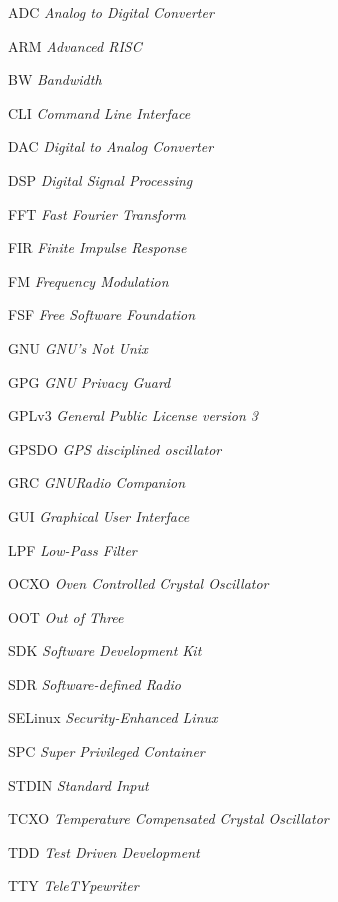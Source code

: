 \documentclass[
  12pt,				%
  openright,			%
  twoside,			%
  a4paper,			%
  english,			%
  french,				%
  spanish,			%
  brazil,				%
  ]{abntex2}
\begin{document}
\begin{siglas}

  \item[ADC]         \textit{Analog to Digital Converter}
  \item[ARM]        \textit{Advanced RISC}
  \item[BW]         \textit{Bandwidth}
  \item[CLI]        \textit{Command Line Interface}
  \item[DAC]        \textit{Digital to Analog Converter}
  \item[DSP]        \textit{Digital Signal Processing}
  \item[FFT]        \textit{Fast Fourier Transform}
  \item[FIR]        \textit{Finite Impulse Response}
  \item[FM]         \textit{Frequency Modulation}
  \item[FSF]        \textit{Free Software Foundation}
  \item[GNU]        \textit{GNU's Not Unix}
  \item[GPG]        \textit{GNU Privacy Guard}
  \item[GPLv3]      \textit{General Public License version 3}
  \item[GPSDO]      \textit{GPS disciplined oscillator}
  \item[GRC]        \textit{GNURadio Companion}
  \item[GUI]        \textit{Graphical User Interface}
  \item[LPF]        \textit{Low-Pass Filter}
  \item[OCXO]       \textit{Oven Controlled Crystal Oscillator}
  \item[OOT]        \textit{Out of Three}
  \item[SDK]        \textit{Software Development Kit}
  \item[SDR]        \textit{Software-defined Radio}
  \item[SELinux]    \textit{Security-Enhanced Linux}
  \item[SPC]        \textit{Super Privileged Container}
  \item[STDIN]      \textit{Standard Input}
  \item[TCXO]       \textit{Temperature Compensated Crystal Oscillator}
  \item[TDD]        \textit{Test Driven Development}
  \item[TTY]        \textit{TeleTYpewriter}

\end{siglas}
\end{document}
